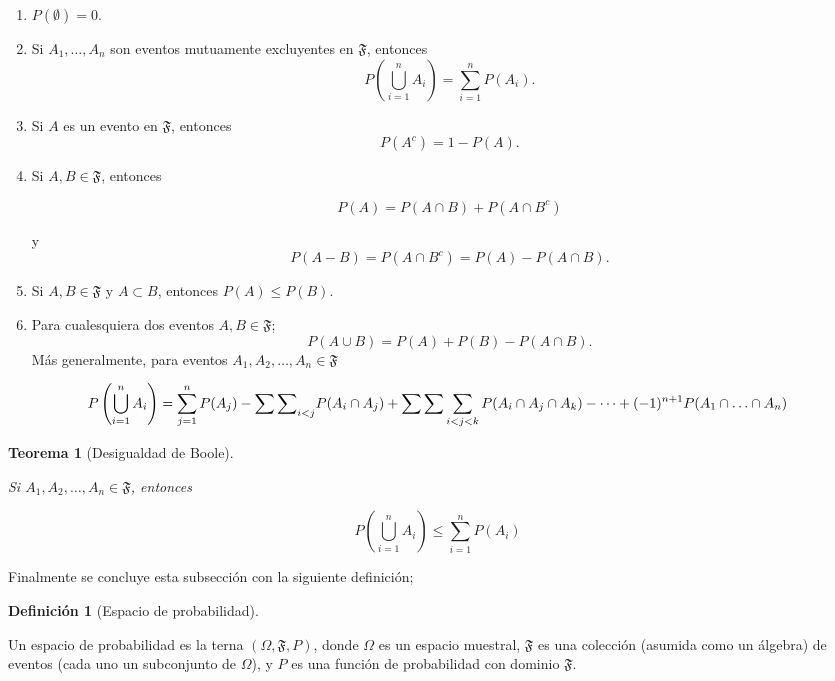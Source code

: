 \documentclass[
  letterpaper,
  DIV=11,
  numbers=noendperiod]{scrreport}
\theoremstyle{plain}
\newtheorem{theorem}{Teorema}[chapter]
\theoremstyle{definition}
\newtheorem{definition}{Definición}[chapter]
\theoremstyle{definition}
\theoremstyle{plain}
\theoremstyle{remark}
\begin{document}
\begin{enumerate}
\def\labelenumi{\roman{enumi}.}
\item
  \(P(\emptyset)=0\).
\item
  Si \(A_1, \ldots, A_n\) son eventos mutuamente excluyentes en
  \(\mathfrak{F}\), entonces
  \[P\left(\bigcup\limits_{i=1}^n A_i\right)= \sum\limits_{i=1}^n P(A_i).\]
\item
  Si \(A\) es un evento en \(\mathfrak{F}\), entonces
  \[P(A^c)= 1-P(A).\]
\item
  Si \(A,B\in\mathfrak{F}\), entonces

  \[P(A)= P(A\cap B)+ P(A\cap B^c)\]

  y \[P(A-B)=P(A\cap B^c)= P(A)-P(A\cap B).\]
\item
  Si \(A,B\in \mathfrak{F}\) y \(A\subset B\), entonces
  \(P(A)\leq P(B)\).
\item
  Para cualesquiera dos eventos \(A,B\in \mathfrak{F}\);
  \[P(A\cup B)= P(A)+P(B)-P(A\cap B).\]Más generalmente, para eventos
  \(A_1, A_2, \ldots, A_n\in \mathfrak{F}\)
\end{enumerate}

\[ P\left(\bigcup\limits_{i=1}^n A_i\right) = \sum_{j=1}^nP(A_j)-{\sum\sum}_{i<j} P(A_i\cap A_j)+\sum\sum\sum_{i<j<k}P(A_i\cap A_j\cap A_k)\\ -\cdots+(-1)^{n+1}P(A_1\cap \ldots\cap A_n) \]

\begin{theorem}[Desigualdad de
Boole]\protect\hypertarget{thm-boole}{}\label{thm-boole}

Si \(A_1, A_2, \ldots, A_n\in\mathfrak{F}\), entonces

\[P\left(\bigcup_{i=1}^n A_i\right)\leq \sum_{i=1}^n P(A_i)\]

\end{theorem}

Finalmente se concluye esta subsección con la siguiente definición;

\begin{definition}[Espacio de
probabilidad]\protect\hypertarget{def-Ep}{}\label{def-Ep}

Un espacio de probabilidad es la terna \((\Omega, \mathfrak{F}, P)\),
donde \(\Omega\) es un espacio muestral, \(\mathfrak{F}\) es una
colección (asumida como un álgebra) de eventos (cada uno un subconjunto
de \(\Omega\)), y \(P\) es una función de probabilidad con dominio
\(\mathfrak{F}\).

\end{definition}
\end{document}
